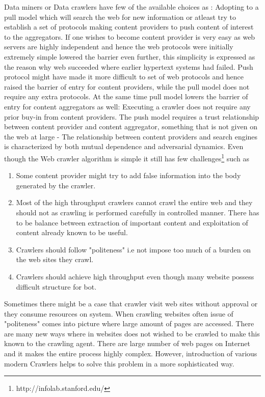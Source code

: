 \documentclass[article,type=msc,colorback,accentcolor=tud9c,twoside,11pt]{tudthesis}
\begin{document}
Data miners or Data crawlers have few of the available choices as : Adopting to a pull model which will search the web for new information or atleast try to establish a set of protocols making content providers to push content of interest to the aggregators. If one wishes to become content provider is very easy as web servers are highly independent and hence the web protocols were initially extremely simple lowered the barrier even further, this simplicity is expressed as the reason why web succeeded where earlier hypertext systems had failed. Push protocol might have made it more difficult to set of web protocols and hence raised the barrier of entry for content providers, while the pull model does not require any extra protocols. At the same time pull model lowers the barrier of entry for content aggregators as well: Executing a crawler does not require any prior buy-in from content providers. The push model requires a trust relationship between content provider and content aggregator, something that is not given on the web at large - The relationship between content providers and search engines is characterized by both mutual dependence and adversarial dynamics.
Even though the Web crawler algorithm is simple it still has few challenges\footnote{http://infolab.stanford.edu/} such as
\begin{enumerate}
\item Some content provider might try to add false information into the body generated by the crawler.
\item Most of the high throughput crawlers cannot crawl the entire web and they should not as crawling is performed carefully in controlled manner. There has to be balance between extraction of important content and exploitation of content already known to be useful.
\item Crawlers should follow "politeness" i.e not impose too much of a burden on the web sites they crawl.
\item Crawlers should achieve high throughput even though many website possess difficult structure for bot.
\end{enumerate}

Sometimes there might be a case that crawler visit web sites without approval or they consume resources on system. When crawling websites often issue of "politeness" comes into picture where large amount of pages are accessed. There are many new ways where in websites does not wished to be crawled to make this known to the crawling agent. There are large number of web pages on Internet and it makes the entire process highly complex. However, introduction of various modern Crawlers helps to solve this problem in a more sophisticated way.
\end{document}

